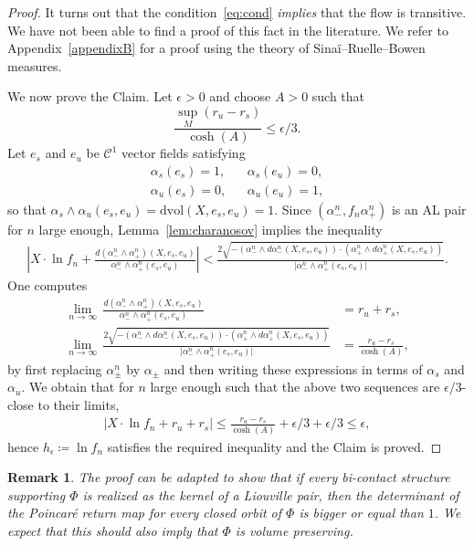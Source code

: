 \documentclass[letterpaper, 11pt]{article}
\numberwithin{equation}{section}
\newtheorem{rem}[thm]{Remark}
\begin{document}
\begin{proof}
It turns out that the condition~\eqref{eq:cond} \emph{implies} that the flow is transitive. We have not been able to find a proof of this fact in the literature. We refer to Appendix~\ref{appendixB} for a proof using the theory of Sina\"{i}--Ruelle--Bowen measures.

We now prove the Claim. Let $\epsilon > 0$ and choose $A>0$ such that $$\frac{\sup_{M}(r_u - r_s)}{\cosh(A)} \leq \epsilon/3.$$ Let $e_s$ and $e_u$ be $\mathcal{C}^1$ vector fields satisfying
\begin{align*}
\alpha_s(e_s) = 1, & & \alpha_s(e_u) = 0, \\
\alpha_u(e_s) = 0, & & \alpha_u(e_u) = 1,
\end{align*}
so that $\alpha_s \wedge \alpha_u(e_s, e_u) = \mathrm{dvol}(X, e_s, e_u) = 1$. Since $(\alpha^n_-, f_n \alpha^n_+)$ is an AL pair for $n$ large enough, Lemma~\ref{lem:charanosov} implies the inequality
\begin{align*}
     \left\vert X \cdot \ln f_n + \frac{d(\alpha^n_- \wedge \alpha^n_+)(X,e_s, e_u)}{\alpha^n_- \wedge \alpha^n_+(e_s, e_u)} \right\vert < \frac{2\sqrt{-\left(\alpha^n_- \wedge d\alpha^n_-(X, e_s, e_u)\right) \cdot \left(\alpha^n_+ \wedge d\alpha^n_+(X, e_s, e_u)\right)}}{\vert\alpha^n_- \wedge \alpha^n_+(e_s, e_u)\vert}.
\end{align*}
One computes
\begin{align*}
    \lim_{n \rightarrow \infty}\,  \frac{d(\alpha^n_- \wedge \alpha^n_+)(X,e_s, e_u)}{\alpha^n_- \wedge \alpha^n_+(e_s, e_u)} &= r_u + r_s, \\
    \lim_{n \rightarrow \infty}\,  \frac{2\sqrt{-\left(\alpha^n_- \wedge d\alpha^n_-(X, e_s, e_u)\right) \cdot \left(\alpha^n_+ \wedge d\alpha^n_+(X, e_s, e_u)\right)}}{\vert\alpha^n_- \wedge \alpha^n_+(e_s, e_u)\vert} &= \frac{r_u - r_s}{\cosh(A)}, 
\end{align*}
by first replacing $\alpha^n_\pm$ by $\alpha_\pm$ and then writing these expressions in terms of $\alpha_s$ and $\alpha_u$. We obtain that for $n$ large enough such that the above two sequences are $\epsilon/3$-close to their limits,
\begin{align*}
    \vert X \cdot \ln f_n + r_u + r_s \vert \leq \frac{r_u-r_s}{\cosh(A)} + \epsilon/3 + \epsilon/3 \leq \epsilon,
\end{align*}
hence $h_\epsilon \coloneqq \ln f_n$ satisfies the required inequality and the Claim is proved.
\end{proof}

\begin{rem} The proof can be adapted to show that if every bi-contact structure supporting $\Phi$ is realized as the kernel of a Liouville pair, then the determinant of the Poincar\'e return map for every closed orbit of $\Phi$ is bigger or equal than $1$. We expect that this should also imply that $\Phi$ is volume preserving.
\end{rem}
\end{document}
